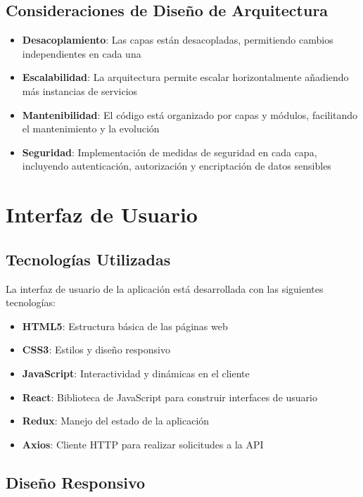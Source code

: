 \documentclass[12pt,a4paper]{article}
\begin{document}
\subsection{Consideraciones de Diseño de Arquitectura}

\begin{itemize}
    \item \textbf{Desacoplamiento}: Las capas están desacopladas, permitiendo cambios independientes en cada una
    \item \textbf{Escalabilidad}: La arquitectura permite escalar horizontalmente añadiendo más instancias de servicios
    \item \textbf{Mantenibilidad}: El código está organizado por capas y módulos, facilitando el mantenimiento y la evolución
    \item \textbf{Seguridad}: Implementación de medidas de seguridad en cada capa, incluyendo autenticación, autorización y encriptación de datos sensibles
\end{itemize}

\section{Interfaz de Usuario}

\subsection{Tecnologías Utilizadas}

La interfaz de usuario de la aplicación está desarrollada con las siguientes tecnologías:

\begin{itemize}
    \item \textbf{HTML5}: Estructura básica de las páginas web
    \item \textbf{CSS3}: Estilos y diseño responsivo
    \item \textbf{JavaScript}: Interactividad y dinámicas en el cliente
    \item \textbf{React}: Biblioteca de JavaScript para construir interfaces de usuario
    \item \textbf{Redux}: Manejo del estado de la aplicación
    \item \textbf{Axios}: Cliente HTTP para realizar solicitudes a la API
\end{itemize}

\subsection{Diseño Responsivo}
\end{document}
